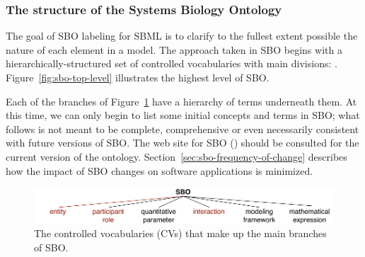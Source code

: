 \subsubsection{The structure of the Systems Biology Ontology}

The goal of SBO labeling for SBML is to clarify to the fullest
extent possible the nature of each element in a model.  The
approach taken in SBO begins with a hierarchically-structured set
of controlled vocabularies with  main divisions: .
Figure~\vref{fig:sbo-top-level} illustrates the highest level of
SBO.

Each of the  branches of Figure~\ref{fig:sbo-top-level} have a
hierarchy of terms underneath them.  At this time, we can only
begin to list some initial concepts and terms in SBO; what follows
is not meant to be complete, comprehensive or even necessarily
consistent with future versions of SBO.  The web site for SBO
(\sboref) should be consulted for the current version of the
ontology.  Section~\ref{sec:sbo-frequency-of-change} describes how
the impact of SBO changes on software applications is minimized.

\begin{figure}[tbh]
  \centering
  \includegraphics[scale = 0.8]{figs/sbo-top-level}
  \vspace*{1ex}
  \caption{The  controlled vocabularies (CVs) that
      make up the main branches of SBO.}
  \label{fig:sbo-top-level}
\end{figure}

